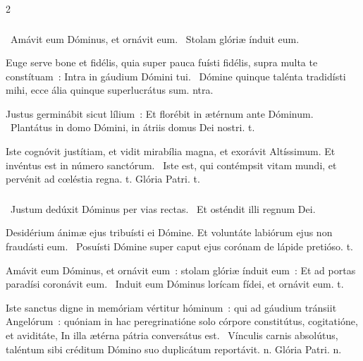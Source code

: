 \documentclass[9pt,twoside]{extarticle}
\begin{document}
\begin{multicols}{2}
\subsubsection*{}
\begin{tightlist}{}
\item {}~Amávit eum Dóminus, et ornávit eum. ~Stolam glóriæ índuit eum.
\item {} Euge serve bone et fidélis, quia super pauca fuísti fidélis, supra multa te constítuam~: \textred{*} Intra in gáudium Dómini tui. ~Dómine quinque talénta tradidísti mihi, ecce ália quinque superlucrátus sum. ntra.
\item {} Justus germinábit sicut lílium~: \textred{*} Et florébit in ætérnum ante Dóminum. ~Plantátus in domo Dómini, in átriis domus Dei nostri. t.
\item {} Iste cognóvit justítiam, et vidit mirabília magna, et exorávit Altíssimum. \textred{*} Et invéntus est in número sanctórum. ~Iste est, qui contémpsit vitam mundi, et pervénit ad cœléstia regna. t. Glória Patri. t.
\end{tightlist}

\subsubsection*{}
\begin{tightlist}{}
\item {}~Justum dedúxit Dóminus per vias rectas. ~Et osténdit illi regnum Dei. 
\item {} Desidérium ánimæ ejus tribuísti ei Dómine. \textred{*} Et voluntáte labiórum ejus non fraudásti eum. ~Posuísti Dómine super caput ejus corónam de lápide pretióso. t.
\item {} Amávit eum Dóminus, et ornávit eum~: stolam glóriæ índuit eum~: \textred{*} Et ad portas paradísi coronávit eum. ~Induit eum Dóminus lorícam fídei, et ornávit eum. t.
\item {} Iste sanctus digne in memóriam vértitur hóminum~: qui ad gáudium tránsiit Angelórum~: quóniam in hac peregrinatióne solo córpore constitútus, cogitatióne, et aviditáte, \textred{*} In illa ætérna pátria conversátus est. ~Vínculis carnis absolútus, taléntum sibi créditum Dómino suo duplicátum reportávit. n. Glória Patri. n.
\end{tightlist}


\end{multicols}
\end{document}
